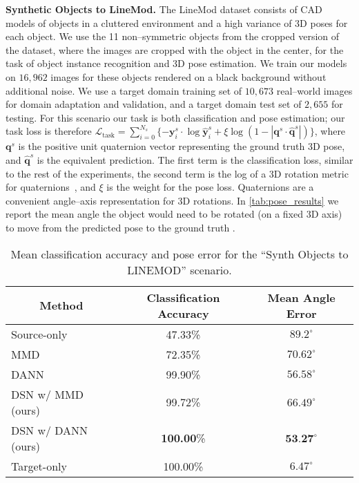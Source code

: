 \documentclass{article}
\newcommand{\bs}[1]{\boldsymbol{\mathbf{#1}}}
\begin{document}
\textbf{Synthetic Objects to LineMod.} The LineMod dataset \cite{wohlhart2015learning} consists of CAD models of objects in a cluttered environment and a high variance of 3D poses for each object. We use the 11 non--symmetric objects from the cropped version of the dataset, where the images are cropped with the object in the center, for the task of object instance recognition and 3D pose estimation. We train our models on $16,962$ images for these objects rendered on a black background without additional noise. We use a target domain training set of $10,673$ real--world images for domain adaptation and validation, and a target domain test set of $2,655$ for testing. For this scenario our task is both classification and pose estimation; our task loss is therefore $\mathcal{L}_\mathrm{task}=\sum_{i=0}^{N_s}\{-\bs y_i^s\cdot \log \hat{\bs y}_i^s+\xi \log(1-|\bs q^s\cdot  \hat{\bs q}^s|)\}$,
where $\bs{q}^s$ is the positive unit quaternion vector representing the ground truth 3D pose, and $\hat{\bs q}^s$ is the equivalent prediction. The first term is the classification loss, similar to the rest of the experiments, the second term is the log of a 3D rotation metric for quaternions~\cite{huynh2009metrics}, and $\xi$ is the weight for the pose loss. Quaternions are a convenient angle--axis representation for 3D rotations. In \autoref{tab:pose_results} we report the mean angle the object would need to be rotated (on a fixed 3D axis) to move from the predicted pose to the ground truth \cite{hinterstoisser2012accv}.



\begin{table}[]
\centering
\caption{Mean classification accuracy and pose error for the ``Synth Objects to LINEMOD'' scenario. }
\label{tab:pose_results}
\begin{tabular}{@{}|l|c|c|@{}}
\hline
\multicolumn{1}{|c|}{\textbf{Method}} & \multicolumn{1}{c|}{\textbf{Classification Accuracy}} & \multicolumn{1}{c|}{\textbf{Mean Angle Error}} \\ \hline \hline
Source-only                           & 47.33\%                                   & $89.2^{\circ}$\\\hline  \hline
MMD                                   & 72.35\%                                        & $70.62^{\circ}$                              \\ \hline
DANN                                  & 99.90\%                                               &$56.58^{\circ}$                 \\ \hline\hline
DSN w/ MMD (ours)                     & 99.72\%                                            &$66.49^{\circ}$\\ \hline
DSN w/ DANN (ours)                    & \textbf{100.00}\%                                           & $\textbf{53.27}^{\circ}$\\ \hline\hline
Target-only                           & 100.00\%                                              &$6.47^{\circ}$                                  \\ \hline
\end{tabular}
\end{table}
\end{document}
